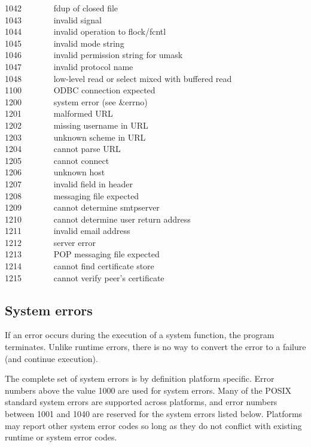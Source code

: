 1042 \ \ \ \ \ \ \ fdup of closed file \\
1043 \ \ \ \ \ \ \ invalid signal \\
1044 \ \ \ \ \ \ \ invalid operation to flock/fcntl\\
1045 \ \ \ \ \ \ \ invalid mode string\\
1046 \ \ \ \ \ \ \ invalid permission string for umask\\
1047 \ \ \ \ \ \ \ invalid protocol name\\
1048 \ \ \ \ \ \ \ low-level read or select mixed with buffered read\\
1100 \ \ \ \ \ \ \ ODBC connection expected\\
1200 \ \ \ \ \ \ \ system error (see \&errno)\\
1201 \ \ \ \ \ \ \ malformed URL\\
1202 \ \ \ \ \ \ \ missing username in URL\\
1203 \ \ \ \ \ \ \ unknown scheme in URL\\
1204 \ \ \ \ \ \ \ cannot parse URL\\
1205 \ \ \ \ \ \ \ cannot connect\\
1206 \ \ \ \ \ \ \ unknown host\\
1207 \ \ \ \ \ \ \ invalid field in header\\
1208 \ \ \ \ \ \ \ messaging file expected\\
1209 \ \ \ \ \ \ \ cannot determine smtpserver\\
1210 \ \ \ \ \ \ \ cannot determine user return address\\
1211 \ \ \ \ \ \ \ invalid email address\\
1212 \ \ \ \ \ \ \ server error\\
1213 \ \ \ \ \ \ \ POP messaging file expected\\
1214 \ \ \ \ \ \ \ cannot find certificate store\\
1215 \ \ \ \ \ \ \ cannot verify peer's certificate\\

\subsection*{System errors}

If an error occurs during the execution of a system
function, the program terminates. Unlike runtime errors, there is no way
to convert the error to a failure (and continue execution).

The complete set of system errors is by definition platform
specific. Error numbers above the value 1000 are used for system errors. Many of
the POSIX standard system errors are supported across platforms, and error
numbers between 1001 and 1040 are reserved for the system errors listed
below. Platforms may report other system error codes so long as they do not
conflict with existing runtime or system error codes.

